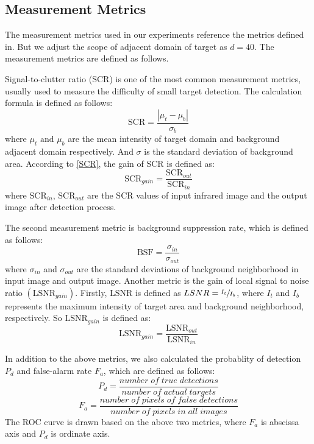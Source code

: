 \documentclass[journal]{IEEEtran}
\begin{document}
\subsection{Measurement Metrics}
The measurement metrics used in our experiments reference the metrics defined in\cite{gao2013infrared}\cite{dai2017reweighted}. But we adjust the scope of adjacent domain of target as $d=40$. The measurement metrics are defined as follows.

Signal-to-clutter ratio (SCR) is one of the most common measurement metrics, usually used to measure the difficulty of small target detection. The calculation formula is defined as follows:
\begin{equation}
  \mbox{SCR}=\frac{\left| \mu_t -\mu_b \right|}{\sigma_b}
  \label{SCR}
\end{equation}
where $\mu_t \text{ and }\mu_b$ are the mean intensity of target domain and background adjacent domain respectively. And $\sigma$ is the standard deviation of background area. According to \ref{SCR}, the gain of SCR is defined as:
\begin{equation}
  \mbox{SCR}_{gain}=\frac{\mbox{SCR}_{out}}{\mbox{SCR}_{in}}
\end{equation}
where $\mbox{SCR}_{in}$, $\mbox{SCR}_{out}$ are the $\mbox{SCR}$ values of input infrared image and the output image after detection process.

The second measurement metric is background suppression rate, which is defined as follows:
\begin{equation}
  \mbox{BSF}=\frac{\sigma_{in}}{\sigma_{out}}
\end{equation}
where $\sigma _{in}$ and $\sigma _{out}$ are the standard deviations of background neighborhood in input image and output image. Another metric is the gain of local signal to noise ratio $(\mbox{LSNR}_{gain})$. Firstly, $\mbox{LSNR}$ is defined as $\relax{LSNR}=\sfrac{I_t}{I_b}$, where $I_t$ and $I_b$ represents the maximum intensity of target area and background neighborhood, respectively. So $\mbox{LSNR}_{gain}$ is defined as:
\begin{equation}
  \mbox{LSNR}_{gain}=\frac{\mbox{LSNR}_{out}}{\mbox{LSNR}_{in}}
\end{equation}

In addition to the above metrics, we also calculated the probablity of detection $P_d$ and false-alarm rate $F_a$, which are defined as follows:
\begin{equation}
  P_d=\frac{number\;of\;true\;detections}{number\;of\;actual\;targets}
\end{equation}
\begin{equation}
  F_a=\frac{number\;of\;pixels\;of\;false\;detections}{number\;of\;pixels\;in\;all\;images}
\end{equation}
The ROC curve is drawn based on the above two metrics, where $F_a$ is abscissa axis and $P_d$ is ordinate axis.
\end{document}

